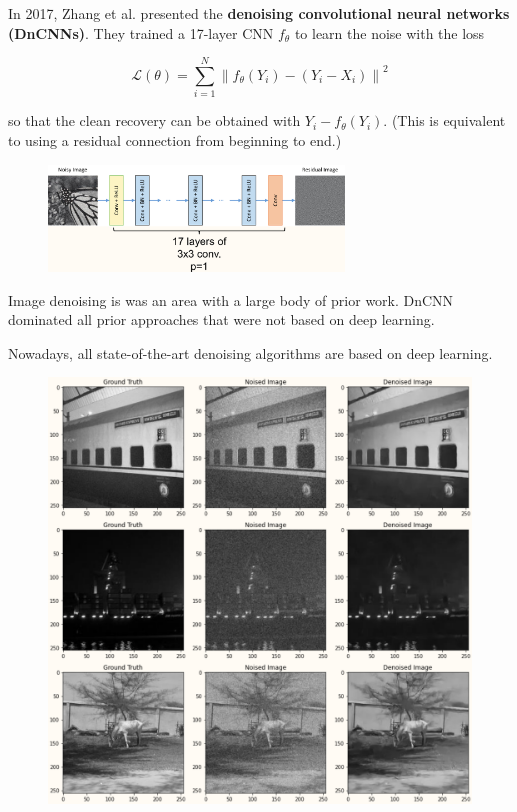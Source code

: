 \begin{definition}[8.4][DnCNN]
    In 2017, Zhang et al. presented the \textbf{denoising convolutional neural networks (DnCNNs)}. They trained a 17-layer CNN $f_{\theta}$ to learn the noise with the loss

    $$
    \mathcal{L}(\theta)=\sum_{i=1}^{N}\left\|f_{\theta}\left(Y_{i}\right)-\left(Y_{i}-X_{i}\right)\right\|^{2}
    $$

    so that the clean recovery can be obtained with $Y_{i}-f_{\theta}\left(Y_{i}\right)$. (This is equivalent to using a residual connection from beginning to end.)

    \begin{figure}[H]
        \centering
        \includegraphics[width=0.7\textwidth]{.././assets/8.1.png}
    \end{figure}

    \par\noindent\textcolor{gray}{\hdashrule{\textwidth}{0.4pt}{1pt 2pt}}

    Image denoising is was an area with a large body of prior work. DnCNN dominated all prior approaches that were not based on deep learning.

    Nowadays, all state-of-the-art denoising algorithms are based on deep learning.

    \begin{figure}[H]
        \centering
        \includegraphics[width=1.0\textwidth]{.././assets/8.2.png}
    \end{figure}


\end{definition}
